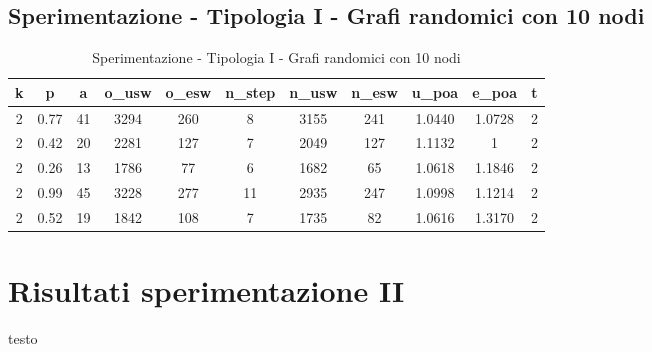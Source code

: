 \subsection{Sperimentazione - Tipologia I - Grafi randomici con 10 nodi}

\begin{table}[H]
\scalebox{0.9} {
\begin{tabular}{|c|c|c|c|c|c|c|c|c|c|c|}
\hline
\textbf{k} & \textbf{p} & \textbf{a} & \textbf{o\_usw} & \textbf{o\_esw} & \textbf{n\_step} & \textbf{n\_usw} & \textbf{n\_esw} & \textbf{u\_poa} & \textbf{e\_poa} & \textbf{t} \\ \hline
2 & 0.77 & 41 & 3294 & 260 & 8 & 3155 & 241 & 1.0440 & 1.0728 & 2 \\ \hline
2 & 0.42 & 20 & 2281 & 127 & 7 & 2049 & 127 & 1.1132 & 1 & 2 \\ \hline
2 & 0.26 & 13 & 1786 & 77 & 6 & 1682 & 65 & 1.0618 & 1.1846 & 2 \\ \hline
2 & 0.99 & 45 & 3228 & 277 & 11 & 2935 & 247 & 1.0998 & 1.1214 & 2 \\ \hline
2 & 0.52 & 19 & 1842 & 108 & 7 & 1735 & 82 & 1.0616 & 1.3170 & 2 \\ \hline
\end{tabular}
}
\caption{Sperimentazione - Tipologia I - Grafi randomici con 10 nodi}
\label{tab:sperimentazione-tipo1-10nodi}
\end{table}

\section{Risultati sperimentazione II}
\justify
testo \\